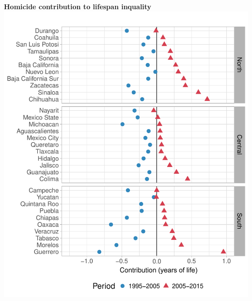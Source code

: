 \documentclass[xcolor={dvipsnames}]{beamer}
\begin{document}
\begin{frame}
	\begin{center}
		\Large{\textbf{Homicide contribution to lifespan inquality}}
		\includegraphics[scale=.47]{Figures/Figure_4}
	\end{center}

\end{frame}
\end{document}
